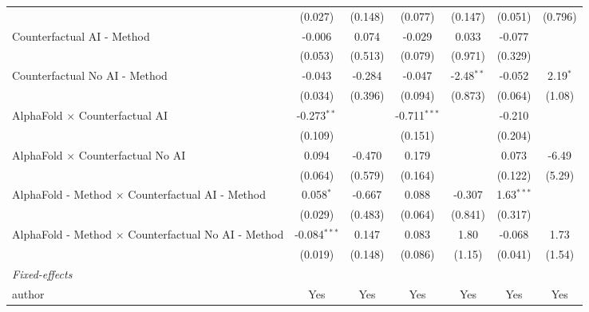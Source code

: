 \begin{tabular}{lcccccc}
                                                              & (0.027)        & (0.148)      & (0.077)        & (0.147)      & (0.051)      & (0.796)\\   
   Counterfactual AI - Method                                 & -0.006         & 0.074        & -0.029         & 0.033        & -0.077       &   \\   
                                                              & (0.053)        & (0.513)      & (0.079)        & (0.971)      & (0.329)      &   \\   
   Counterfactual No AI - Method                              & -0.043         & -0.284       & -0.047         & -2.48$^{**}$ & -0.052       & 2.19$^{*}$\\   
                                                              & (0.034)        & (0.396)      & (0.094)        & (0.873)      & (0.064)      & (1.08)\\   
   AlphaFold $\times$ Counterfactual AI                       & -0.273$^{**}$  &              & -0.711$^{***}$ &              & -0.210       &   \\   
                                                              & (0.109)        &              & (0.151)        &              & (0.204)      &   \\   
   AlphaFold $\times$ Counterfactual No AI                    & 0.094          & -0.470       & 0.179          &              & 0.073        & -6.49\\   
                                                              & (0.064)        & (0.579)      & (0.164)        &              & (0.122)      & (5.29)\\   
   AlphaFold - Method $\times$ Counterfactual AI - Method     & 0.058$^{*}$    & -0.667       & 0.088          & -0.307       & 1.63$^{***}$ &   \\   
                                                              & (0.029)        & (0.483)      & (0.064)        & (0.841)      & (0.317)      &   \\   
   AlphaFold - Method $\times$ Counterfactual No AI - Method  & -0.084$^{***}$ & 0.147        & 0.083          & 1.80         & -0.068       & 1.73\\   
                                                              & (0.019)        & (0.148)      & (0.086)        & (1.15)       & (0.041)      & (1.54)\\   
   \midrule
   \emph{Fixed-effects}\\
   author                                                     & Yes            & Yes          & Yes            & Yes          & Yes          & Yes\\  

\end{tabular}
